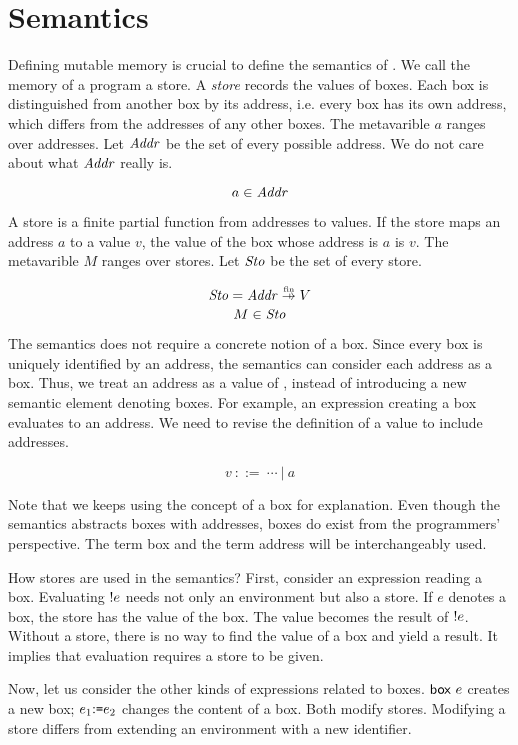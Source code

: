 \section{Semantics}

Defining mutable memory is crucial to define the semantics of \lang.
We call the memory of a program a store. A \textit{store} records the values of boxes.
Each box is distinguished from another box by its address, i.e. every box has
its own address, which differs from the addresses of any other boxes.
The metavarible $a$ ranges over addresses. Let $\mbox{\emph{Addr}}$ be the set of every
possible address. We do not care about what $\mbox{\emph{Addr}}$ really is.

\[ a \in \mbox{\emph{Addr}} \]

A store is a finite partial function from addresses to values.
If the store maps an address $a$ to a value $v$, the value of the box whose
address is $a$ is $v$. The metavarible $M$ ranges over stores. Let $\mbox{\emph{Sto}}$
be the set of every store.

\[ \embox{Sto} = \embox{Addr}\finto V \]
\[ M \in \mbox{\emph{Sto}} \]

The semantics does not require a concrete notion of a box. Since every
box is uniquely identified by an address, the semantics can consider each
address as a box. Thus, we treat an address as a value of \lang, instead of
introducing a new semantic element denoting boxes. For example, an expression
creating a box evaluates to an address. We need to revise the definition of a
value to include addresses.

\[ v\ ::=\ \cdots\ |\ a \]

Note that we keeps using the concept of a box for explanation.
Even though the semantics abstracts boxes with addresses,
boxes do exist from the programmers' perspective.
The term box and the term address will be interchangeably used.

How stores are used in the semantics? First, consider an expression reading a
box. Evaluating \(!e\) needs not only an environment but also a store.
If $e$ denotes a box, the store has the value of the box. The value becomes
the result of \(!e\). Without a store, there is no way to find the value
of a box and yield a result. It implies that evaluation requires a store to be
given.

Now, let us consider the other kinds of expressions related to boxes.
$\textsf{box}\ e$ creates a new box; $e_1{:}\texttt{=} e_2$ changes
the content of a box. Both modify stores. Modifying a store differs from
extending an environment with a new identifier.

